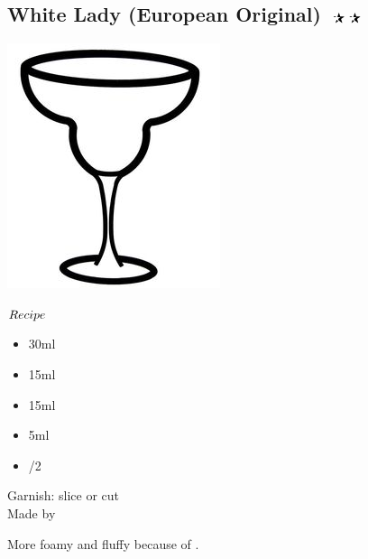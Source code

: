 \subsection{White Lady (European Original) $\openbigstar\openbigstar$}
\vspace{-7mm}
\hspace{90mm}
\includegraphics[scale=.05]{cocktail_glass_snow.jpg}
\vspace{2.5mm}
\begin{itembox}[l]{\boldmath $Recipe$}
\begin{itemize}
\setlength{\parskip}{0cm}
\setlength{\itemsep}{0cm}
\item \gin 30ml
\item \wc 15ml
\item \lj 15ml
\item \gumsyrup 5ml
\item {}/2
\end{itemize}
\vspace{-4mm}
Garnish: \lemon slice or cut\\
Made by \shake
\end{itembox}
More foamy and fluffy because of \ew
\hspace{-1mm}.
